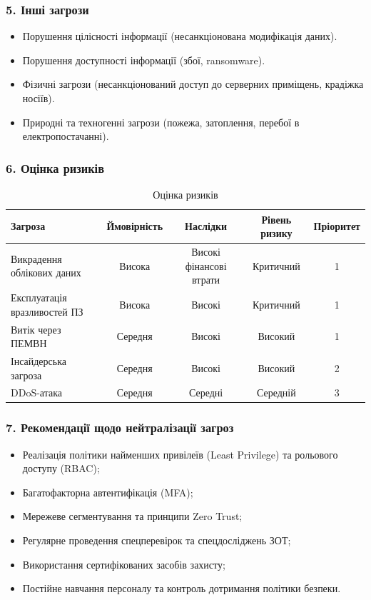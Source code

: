 \documentclass{article}
\begin{document}
\subsubsection{5. Інші загрози}
\begin{itemize}
    \item Порушення цілісності інформації (несанкціонована модифікація даних).
    \item Порушення доступності інформації (збої, ransomware).
    \item Фізичні загрози (несанкціонований доступ до серверних приміщень, крадіжка носіїв).
    \item Природні та техногенні загрози (пожежа, затоплення, перебої в електропостачанні).
\end{itemize}

\subsubsection{6. Оцінка ризиків}

\begin{table}[h!]
\hspace*{-3cm}
\centering
\small
\begin{tabular}{lcccc}
\hline
\textbf{Загроза} & \textbf{Ймовірність} & \textbf{Наслідки} & \textbf{Рівень ризику} & \textbf{Пріоритет} \\
\hline
Викрадення облікових даних           & Висока  & Високі фінансові втрати & Критичний & 1 \\
Експлуатація вразливостей ПЗ         & Висока  & Високі                  & Критичний & 1 \\
Витік через ПЕМВН                    & Середня & Високі                  & Високий   & 1 \\
Інсайдерська загроза                 & Середня & Високі                  & Високий   & 2 \\
DDoS-атака                           & Середня & Середні                 & Середній  & 3 \\
\hline
\end{tabular}
\caption{Оцінка ризиків}
\label{tab:risk-assessment}
\end{table}

\subsubsection{7. Рекомендації щодо нейтралізації загроз}
\begin{itemize}
    \item Реалізація політики найменших привілеїв (Least Privilege) та рольового доступу (RBAC);
    \item Багатофакторна автентифікація (MFA);
    \item Мережеве сегментування та принципи Zero Trust;
    \item Регулярне проведення спецперевірок та спецдосліджень ЗОТ;
    \item Використання сертифікованих засобів захисту;
    \item Постійне навчання персоналу та контроль дотримання політики безпеки.
\end{itemize}
\end{document}
